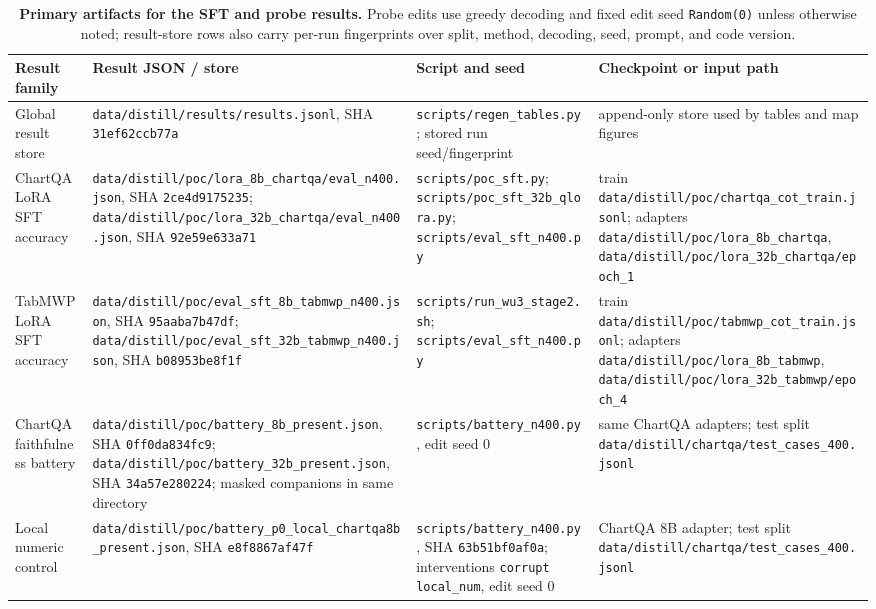 \documentclass[11pt]{article}
\begin{document}
\begin{table}[t]
\centering
\tiny
\setlength{\tabcolsep}{2pt}
\renewcommand{\arraystretch}{0.82}
\caption{\textbf{Primary artifacts for the SFT and probe results.} Probe edits use greedy decoding and fixed edit seed \texttt{Random(0)} unless otherwise noted; result-store rows also carry per-run fingerprints over split, method, decoding, seed, prompt, and code version.}
\label{tab:artifacts}
\begin{tabular}{@{}L{0.18\textwidth}L{0.31\textwidth}L{0.25\textwidth}L{0.19\textwidth}@{}}
\toprule
Result family & Result JSON / store & Script and seed & Checkpoint or input path \\
\midrule
Global result store & \nolinkurl{data/distill/results/results.jsonl}, SHA \texttt{31ef62ccb77a} & \nolinkurl{scripts/regen_tables.py}; stored run seed/fingerprint & append-only store used by tables and map figures \\
ChartQA LoRA SFT accuracy & \nolinkurl{data/distill/poc/lora_8b_chartqa/eval_n400.json}, SHA \texttt{2ce4d9175235}; \nolinkurl{data/distill/poc/lora_32b_chartqa/eval_n400.json}, SHA \texttt{92e59e633a71} & \nolinkurl{scripts/poc_sft.py}; \nolinkurl{scripts/poc_sft_32b_qlora.py}; \nolinkurl{scripts/eval_sft_n400.py} & train \nolinkurl{data/distill/poc/chartqa_cot_train.jsonl}; adapters \nolinkurl{data/distill/poc/lora_8b_chartqa}, \nolinkurl{data/distill/poc/lora_32b_chartqa/epoch_1} \\
TabMWP LoRA SFT accuracy & \nolinkurl{data/distill/poc/eval_sft_8b_tabmwp_n400.json}, SHA \texttt{95aaba7b47df}; \nolinkurl{data/distill/poc/eval_sft_32b_tabmwp_n400.json}, SHA \texttt{b08953be8f1f} & \nolinkurl{scripts/run_wu3_stage2.sh}; \nolinkurl{scripts/eval_sft_n400.py} & train \nolinkurl{data/distill/poc/tabmwp_cot_train.jsonl}; adapters \nolinkurl{data/distill/poc/lora_8b_tabmwp}, \nolinkurl{data/distill/poc/lora_32b_tabmwp/epoch_4} \\
ChartQA faithfulness battery & \nolinkurl{data/distill/poc/battery_8b_present.json}, SHA \texttt{0ff0da834fc9}; \nolinkurl{data/distill/poc/battery_32b_present.json}, SHA \texttt{34a57e280224}; masked companions in same directory & \nolinkurl{scripts/battery_n400.py}, edit seed 0 & same ChartQA adapters; test split \nolinkurl{data/distill/chartqa/test_cases_400.jsonl} \\
Local numeric control & \nolinkurl{data/distill/poc/battery_p0_local_chartqa8b_present.json}, SHA \texttt{e8f8867af47f} & \nolinkurl{scripts/battery_n400.py}, SHA \texttt{63b51bf0af0a}; interventions \texttt{corrupt local\_num}, edit seed 0 & ChartQA 8B adapter; test split \nolinkurl{data/distill/chartqa/test_cases_400.jsonl} \\

\end{tabular}
\end{table}
\end{document}
